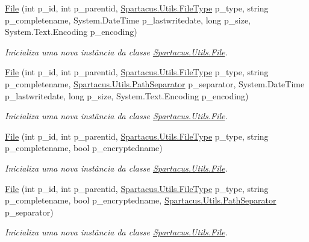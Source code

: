 \begin{DoxyCompactItemize}
\hyperlink{classSpartacus_1_1Utils_1_1File_abc4d0978855b91e7ef4dfafdb631778f}{File} (int p\+\_\+id, int p\+\_\+parentid, \hyperlink{namespaceSpartacus_1_1Utils_a2bc44488e88db523cb2dcffaa6e77541}{Spartacus.\+Utils.\+File\+Type} p\+\_\+type, string p\+\_\+completename, System.\+Date\+Time p\+\_\+lastwritedate, long p\+\_\+size, System.\+Text.\+Encoding p\+\_\+encoding)
\begin{DoxyCompactList}\small\item\em Inicializa uma nova instância da classe \hyperlink{classSpartacus_1_1Utils_1_1File}{Spartacus.\+Utils.\+File}. \end{DoxyCompactList}\item 
\hyperlink{classSpartacus_1_1Utils_1_1File_a18acaaace0997553d2d9bcd4587300df}{File} (int p\+\_\+id, int p\+\_\+parentid, \hyperlink{namespaceSpartacus_1_1Utils_a2bc44488e88db523cb2dcffaa6e77541}{Spartacus.\+Utils.\+File\+Type} p\+\_\+type, string p\+\_\+completename, \hyperlink{namespaceSpartacus_1_1Utils_a9ee24558a33d60b42674bae3eed2a094}{Spartacus.\+Utils.\+Path\+Separator} p\+\_\+separator, System.\+Date\+Time p\+\_\+lastwritedate, long p\+\_\+size, System.\+Text.\+Encoding p\+\_\+encoding)
\begin{DoxyCompactList}\small\item\em Inicializa uma nova instância da classe \hyperlink{classSpartacus_1_1Utils_1_1File}{Spartacus.\+Utils.\+File}. \end{DoxyCompactList}\item 
\hyperlink{classSpartacus_1_1Utils_1_1File_a2f6686e920e27457a846ef4067e79410}{File} (int p\+\_\+id, int p\+\_\+parentid, \hyperlink{namespaceSpartacus_1_1Utils_a2bc44488e88db523cb2dcffaa6e77541}{Spartacus.\+Utils.\+File\+Type} p\+\_\+type, string p\+\_\+completename, bool p\+\_\+encryptedname)
\begin{DoxyCompactList}\small\item\em Inicializa uma nova instância da classe \hyperlink{classSpartacus_1_1Utils_1_1File}{Spartacus.\+Utils.\+File}. \end{DoxyCompactList}\item 
\hyperlink{classSpartacus_1_1Utils_1_1File_acd5456fa895296fccf1964209aa1a94a}{File} (int p\+\_\+id, int p\+\_\+parentid, \hyperlink{namespaceSpartacus_1_1Utils_a2bc44488e88db523cb2dcffaa6e77541}{Spartacus.\+Utils.\+File\+Type} p\+\_\+type, string p\+\_\+completename, bool p\+\_\+encryptedname, \hyperlink{namespaceSpartacus_1_1Utils_a9ee24558a33d60b42674bae3eed2a094}{Spartacus.\+Utils.\+Path\+Separator} p\+\_\+separator)
\begin{DoxyCompactList}\small\item\em Inicializa uma nova instância da classe \hyperlink{classSpartacus_1_1Utils_1_1File}{Spartacus.\+Utils.\+File}. \end{DoxyCompactList}\item 

\end{DoxyCompactItemize}
